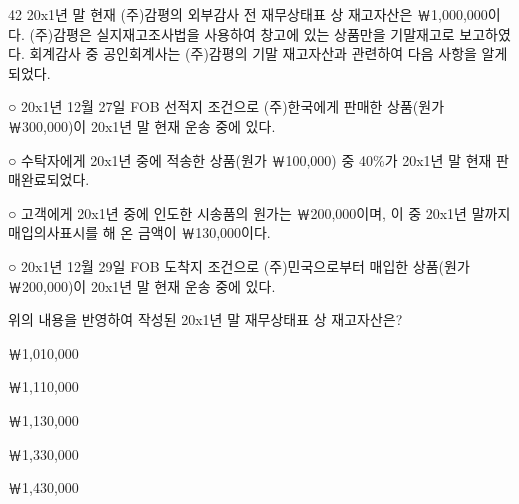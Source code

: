 \begin{question}{42}
20x1년 말 현재 (주)감평의 외부감사 전 재무상태표 상 재고자산은 ￦1,000,000이다. (주)감평은 실지재고조사법을 사용하여 창고에 있는 상품만을 기말재고로 보고하였다. 회계감사 중 공인회계사는 (주)감평의 기말 재고자산과 관련하여 다음 사항을 알게 되었다.
\begin{framedtext}
○ 20x1년 12월 27일 FOB 선적지 조건으로 (주)한국에게 판매한 상품(원가 ￦300,000)이 20x1년 말 현재 운송 중에 있다. \par
○ 수탁자에게 20x1년 중에 적송한 상품(원가 ￦100,000) 중 40\%가 20x1년 말 현재 판매완료되었다. \par
○ 고객에게 20x1년 중에 인도한 시송품의 원가는 ￦200,000이며, 이 중 20x1년 말까지 매입의사표시를 해 온 금액이 ￦130,000이다. \par
○ 20x1년 12월 29일 FOB 도착지 조건으로 (주)민국으로부터 매입한 상품(원가 ￦200,000)이 20x1년 말 현재 운송 중에 있다. \par
\end{framedtext}
위의 내용을 반영하여 작성된 20x1년 말 재무상태표 상 재고자산은? \par
\begin{choices}
  \item ￦1,010,000
  \item ￦1,110,000
  \item ￦1,130,000
  \item ￦1,330,000
  \item ￦1,430,000
\end{choices}
\end{question}
